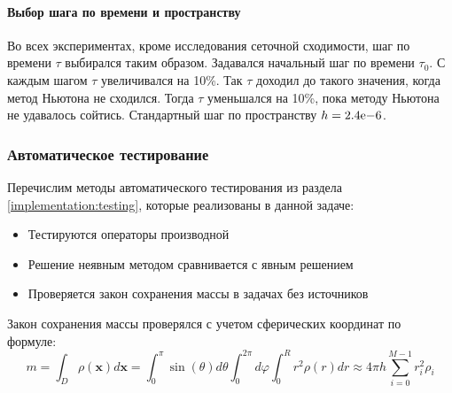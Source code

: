 \paragraph{Выбор шага по времени и пространству} Во всех экспериментах, кроме исследования сеточной сходимости, шаг по времени $\tau$ выбирался таким образом. Задавался начальный шаг по времени $\tau_0$. С каждым шагом $\tau$ увеличивался на 10\%. Так $\tau$ доходил до такого значения, когда метод Ньютона не сходился. Тогда $\tau$ уменьшался на 10\%, пока методу Ньютона не удавалось сойтись. Стандартный шаг по пространству $h = {2.4}\mathrm{e}{-6}$.

\subsubsection{Автоматическое тестирование}
Перечислим методы автоматического тестирования из раздела \ref{implementation:testing}, которые реализованы в данной задаче:
\begin{itemize}
\item Тестируются операторы производной
\item Решение неявным методом сравнивается с явным решением
\item Проверяется закон сохранения массы в задачах без источников
\end{itemize}
Закон сохранения массы проверялся с учетом сферических координат по формуле:
\begin{equation}
m = \int_{D} \rho(\mathbf{x}) d\mathbf{x} = \int_0^\pi \sin(\theta) d\theta \int_0^{2\pi} d\varphi \int_0^R r^2 \rho(r) dr \approx 4\pi h \sum_{i=0}^{M-1} r_i^2 \rho_i
\end{equation}

